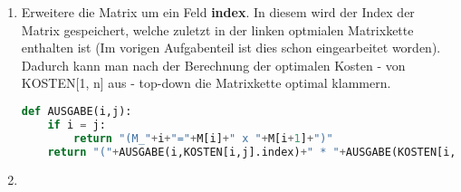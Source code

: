 \documentclass[a4paper,10pt]{article}
\begin{document}
\begin{enumerate}
\begin{description}
	\end{description}
\item Erweitere die Matrix um ein Feld \textbf{index}. In diesem wird der Index der Matrix gespeichert, welche zuletzt in der linken optmialen Matrixkette enthalten ist (Im vorigen Aufgabenteil ist dies schon eingearbeitet worden). Dadurch kann man nach der Berechnung der optimalen Kosten - von KOSTEN[1, n] aus - top-down die Matrixkette optimal klammern.
\begin{lstlisting}[mathescape=true,language=Python,caption={AUSGABE}]
def AUSGABE(i,j):
    if i = j:
        return "(M_"+i+"="+M[i]+" x "+M[i+1]+")"
    return "("+AUSGABE(i,KOSTEN[i,j].index)+" * "+AUSGABE(KOSTEN[i,j].index+1,j)+")"
\end{lstlisting}
\item 
\end{enumerate}
\end{document}
